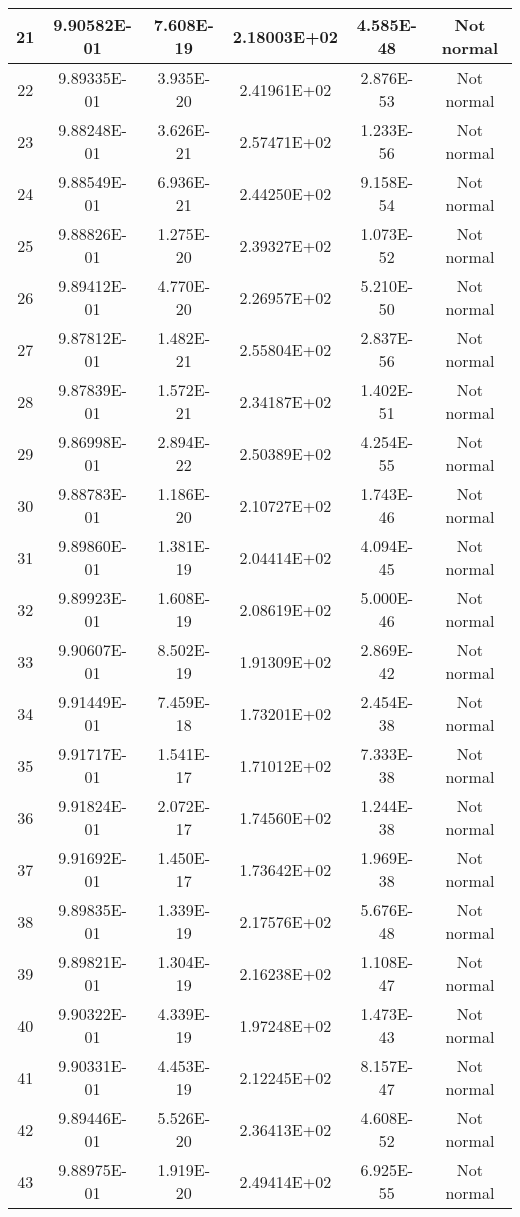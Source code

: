 \begin{table}[h]
\begin{tabular}{|c|c|c|c|c|c|}
		21 & 9.90582E-01 & 7.608E-19 & 2.18003E+02 & 4.585E-48 & Not normal\\\hline
		22 & 9.89335E-01 & 3.935E-20 & 2.41961E+02 & 2.876E-53 & Not normal\\\hline
		23 & 9.88248E-01 & 3.626E-21 & 2.57471E+02 & 1.233E-56 & Not normal\\\hline
		24 & 9.88549E-01 & 6.936E-21 & 2.44250E+02 & 9.158E-54 & Not normal\\\hline
		25 & 9.88826E-01 & 1.275E-20 & 2.39327E+02 & 1.073E-52 & Not normal\\\hline
		26 & 9.89412E-01 & 4.770E-20 & 2.26957E+02 & 5.210E-50 & Not normal\\\hline
		27 & 9.87812E-01 & 1.482E-21 & 2.55804E+02 & 2.837E-56 & Not normal\\\hline
		28 & 9.87839E-01 & 1.572E-21 & 2.34187E+02 & 1.402E-51 & Not normal\\\hline
		29 & 9.86998E-01 & 2.894E-22 & 2.50389E+02 & 4.254E-55 & Not normal\\\hline
		30 & 9.88783E-01 & 1.186E-20 & 2.10727E+02 & 1.743E-46 & Not normal\\\hline
		31 & 9.89860E-01 & 1.381E-19 & 2.04414E+02 & 4.094E-45 & Not normal\\\hline
		32 & 9.89923E-01 & 1.608E-19 & 2.08619E+02 & 5.000E-46 & Not normal\\\hline
		33 & 9.90607E-01 & 8.502E-19 & 1.91309E+02 & 2.869E-42 & Not normal\\\hline
		34 & 9.91449E-01 & 7.459E-18 & 1.73201E+02 & 2.454E-38 & Not normal\\\hline
		35 & 9.91717E-01 & 1.541E-17 & 1.71012E+02 & 7.333E-38 & Not normal\\\hline
		36 & 9.91824E-01 & 2.072E-17 & 1.74560E+02 & 1.244E-38 & Not normal\\\hline
		37 & 9.91692E-01 & 1.450E-17 & 1.73642E+02 & 1.969E-38 & Not normal\\\hline
		38 & 9.89835E-01 & 1.339E-19 & 2.17576E+02 & 5.676E-48 & Not normal\\\hline
		39 & 9.89821E-01 & 1.304E-19 & 2.16238E+02 & 1.108E-47 & Not normal\\\hline
		40 & 9.90322E-01 & 4.339E-19 & 1.97248E+02 & 1.473E-43 & Not normal\\\hline
		41 & 9.90331E-01 & 4.453E-19 & 2.12245E+02 & 8.157E-47 & Not normal\\\hline
		42 & 9.89446E-01 & 5.526E-20 & 2.36413E+02 & 4.608E-52 & Not normal\\\hline
		43 & 9.88975E-01 & 1.919E-20 & 2.49414E+02 & 6.925E-55 & Not normal\\\hline

\end{tabular}
\end{table}
